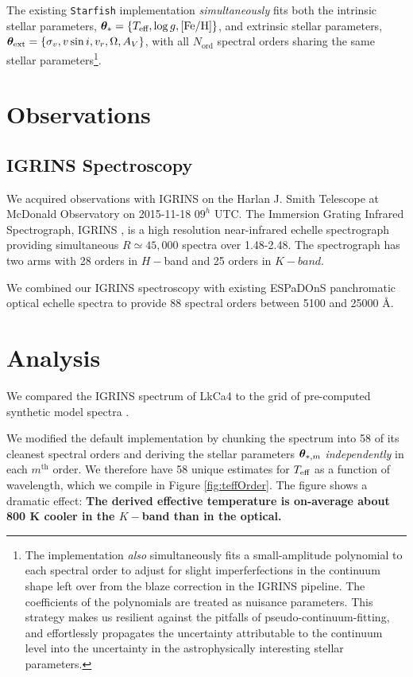 \documentclass[onecolumn]{emulateapj}%
\newcommand{\name}{LkCa4 }
\begin{document}
The existing \texttt{Starfish} implementation \emph{simultaneously} fits both the intrinsic stellar parameters, ${\bm \theta}_{\ast} = \{T_\textrm{eff}, \log g, [{\rm Fe}/{\rm H}] \}$, and extrinsic stellar parameters, ${\bm \theta}_{\rm ext} = \{\sigma_v, v \sin i, v_r, \Omega, A_V\}$, with all $N_{\mathrm{ord}}$ spectral orders sharing the same stellar parameters\footnote{The implementation \emph{also} simultaneously fits a small-amplitude polynomial to each spectral order to adjust for slight imperferfections in the continuum shape left over from the blaze correction in the IGRINS pipeline.  The coefficients of the polynomials are treated as nuisance parameters.  This strategy makes us resilient against the pitfalls of pseudo-continuum-fitting, and effortlessly propagates the uncertainty attributable to the continuum level into the uncertainty in the astrophysically interesting stellar parameters.}.  


\section{Observations}\label{sec:obs} 

\subsection{IGRINS Spectroscopy}\label{sec:igrins} 
We acquired observations with IGRINS on the Harlan J. Smith Telescope at McDonald Observatory on 2015-11-18 $09^h$ UTC.  The Immersion Grating Infrared Spectrograph, IGRINS \citep{2014SPIE.9147E..1DP,2012SPIE.8450E..2SG}, is a high resolution near-infrared echelle spectrograph providing simultaneous $R\simeq45,000$ spectra over 1.48-2.48\um.  The spectrograph has two arms with 28 orders in $H-$band and 25 orders in $K-band$.

We combined our IGRINS spectroscopy with existing ESPaDOnS panchromatic optical echelle spectra to provide 88 spectral orders between 5100 and 25000 \AA \citep{2014MNRAS.444.3220D}.

\section{Analysis}
We compared the IGRINS spectrum of \name to the \PHOENIX grid of pre-computed synthetic model spectra \citep{2013A&A...553A...6H}.  

We modified the default implementation by chunking the spectrum into 58 of its cleanest spectral orders and deriving the stellar parameters ${\bm \theta}_{\ast,m}$ \emph{independently} in each $m^{\mathrm{th}}$ order.  We therefore have 58 unique estimates for $T_\textrm{eff}$ as a function of wavelength, which we compile in Figure \ref{fig:teffOrder}.  The figure shows a dramatic effect: \textbf{The derived effective temperature is on-average about 800 K cooler in the $K-$band than in the optical.}  
\end{document}
